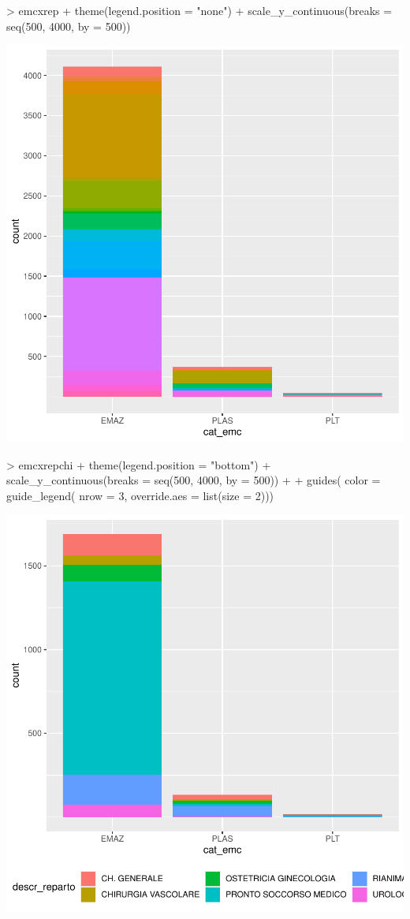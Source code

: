 \documentclass{article}
\begin{document}
\begin{Schunk}
\begin{Sinput}
> emcxrep + theme(legend.position = "none") +  scale_y_continuous(breaks = seq(500, 4000, by = 500))
\end{Sinput}
\end{Schunk}
\includegraphics{tidigg-016}
\begin{Schunk}
\begin{Sinput}
> emcxrepchi + theme(legend.position = "bottom") +  scale_y_continuous(breaks = seq(500, 4000, by = 500)) +
+ guides( color = guide_legend( nrow = 3, override.aes = list(size = 2)))
\end{Sinput}
\end{Schunk}
\includegraphics{tidigg-017}
\end{document}
